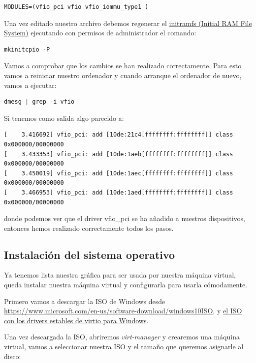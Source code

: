 \documentclass[12pt]{article}
\begin{document}
\begin{verbatim}
MODULES=(vfio_pci vfio vfio_iommu_type1 )
\end{verbatim}

Una vez editado nuestro archivo debemos regenerar el \href{https://en.wikipedia.org/wiki/Initial\_ramdisk}{initramfs (Initial RAM File System)} ejecutando con permisos de administrador el comando:

\begin{verbatim}
mkinitcpio -P
\end{verbatim}

Vamos a comprobar que los cambios se han realizado correctamente. Para esto vamos a reiniciar nuestro ordenador y cuando arranque el ordenador de nuevo, vamos a ejecutar:

\begin{verbatim}
dmesg | grep -i vfio
\end{verbatim}

Si tenemos como salida algo parecido a:

\begin{lstlisting}[basicstyle=\scriptsize\ttfamily]
[    3.416692] vfio_pci: add [10de:21c4[ffffffff:ffffffff]] class 0x000000/00000000
[    3.433353] vfio_pci: add [10de:1aeb[ffffffff:ffffffff]] class 0x000000/00000000
[    3.450019] vfio_pci: add [10de:1aec[ffffffff:ffffffff]] class 0x000000/00000000
[    3.466953] vfio_pci: add [10de:1aed[ffffffff:ffffffff]] class 0x000000/00000000
\end{lstlisting}

donde podemos ver que el driver vfio\_pci se ha añadido a nuestros dispositivos, entonces hemos realizado correctamente todos los pasos.

\subsection{Instalación del sistema operativo}

Ya tenemos lista nuestra gráfica para ser usada por nuestra máquina virtual, queda instalar nuestra máquina virtual y configurarla para usarla cómodamente.

Primero vamos a descargar la ISO de Windows desde \href{https://www.microsoft.com/en-us/software-download/windows10ISO}{https://www.microsoft.com/en-us/software-download/windows10ISO}, y \href{https://github.com/virtio-win/virtio-win-pkg-scripts/blob/master/README.md}{el ISO con los drivers estables de virtio para Windows}.

Una vez descargada la ISO, abriremos \emph{virt-manager} y crearemos una máquina virtual, vamos a seleccionar nuestra ISO y el tamaño que queremos asignarle al disco:
\end{document}
